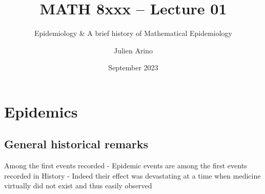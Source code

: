 \documentclass[aspectratio=43]{beamer}
\title{MATH 8xxx -- Lecture 01}
\subtitle{Epidemiology \& A brief history of Mathematical Epidemiology}
\author{Julien Arino}
\date{September 2023}
\begin{document}


\begin{frame}
  \titlepage
\end{frame}
\addtocounter{page}{-1}

\section{Epidemics}

\subsection{General historical remarks}
\begin{frame}{Among the first events recorded}
- Epidemic events are among the first events recorded in History
\vfill
- Indeed their effect was devastating at a time when medicine virtually did not exist and thus easily observed
\end{frame}
\end{document}
